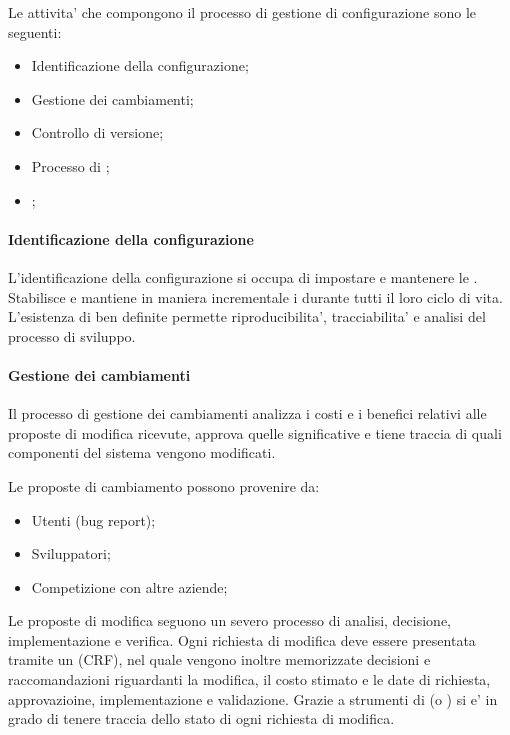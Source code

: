 Le attivita' che compongono il processo di gestione di configurazione sono le
seguenti:

\begin{itemize}
	\item Identificazione della configurazione;
	\item Gestione dei cambiamenti;
	\item Controllo di versione;
	\item Processo di ;
	\item {};
\end{itemize}

\paragraph{Identificazione della configurazione}

L'identificazione della configurazione si occupa di impostare e mantenere le
. Stabilisce e mantiene in maniera incrementale i
 durante tutti il loro ciclo di vita. L'esistenza
di  ben definite permette riproducibilita', tracciabilita' e
analisi del processo di sviluppo.

\paragraph{Gestione dei cambiamenti}

Il processo di gestione dei cambiamenti analizza i costi e i benefici relativi
alle proposte di modifica ricevute, approva quelle significative e tiene traccia
di quali componenti del sistema vengono modificati.

Le proposte di cambiamento possono provenire da:

\begin{itemize}
	\item Utenti (bug report);
	\item Sviluppatori;
	\item Competizione con altre aziende;
\end{itemize}

Le proposte di modifica seguono un severo processo di analisi, decisione,
implementazione e verifica. Ogni richiesta di modifica deve essere presentata
tramite un  (CRF), nel quale vengono inoltre
memorizzate decisioni e raccomandazioni riguardanti la modifica, il costo
stimato e le date di richiesta, approvazioine, implementazione e validazione.
Grazie a strumenti di  (o ) si e'
in grado di tenere traccia dello stato di ogni richiesta di modifica.

